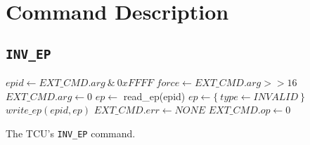 \section{Command Description}

\subsection{\texttt{INV\_EP}}

\begin{algorithm}[H]
    $epid \gets EXT\_CMD.arg\ \&\ 0xFFFF$\;
    $force \gets EXT\_CMD.arg >> 16$\;
    \BlankLine
    $EXT\_CMD.arg \gets 0$\;
    \BlankLine
    $ep \gets$ read\_ep(epid)\;
    \BlankLine
    $ep \gets \{~type \gets INVALID~\}$\;
    $write\_ep(epid, ep)$\;
    \BlankLine
    $EXT\_CMD.err \gets NONE$\;
    $EXT\_CMD.op \gets 0$\;
    \caption{The TCU's \texttt{INV\_EP} command.}
\end{algorithm}
